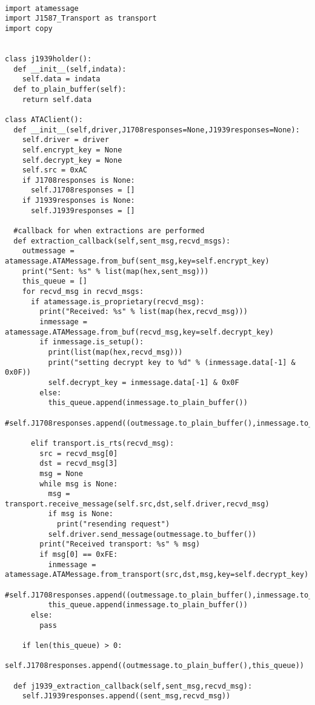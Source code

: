 \begin{verbatim}

import atamessage
import J1587_Transport as transport
import copy


class j1939holder():
  def __init__(self,indata):
    self.data = indata
  def to_plain_buffer(self):
    return self.data

class ATAClient():
  def __init__(self,driver,J1708responses=None,J1939responses=None):
    self.driver = driver
    self.encrypt_key = None
    self.decrypt_key = None
    self.src = 0xAC
    if J1708responses is None:
      self.J1708responses = []
    if J1939responses is None:
      self.J1939responses = []

  #callback for when extractions are performed
  def extraction_callback(self,sent_msg,recvd_msgs):
    outmessage = atamessage.ATAMessage.from_buf(sent_msg,key=self.encrypt_key)
    print("Sent: %s" % list(map(hex,sent_msg)))
    this_queue = []
    for recvd_msg in recvd_msgs:
      if atamessage.is_proprietary(recvd_msg):
        print("Received: %s" % list(map(hex,recvd_msg)))
        inmessage = atamessage.ATAMessage.from_buf(recvd_msg,key=self.decrypt_key)
        if inmessage.is_setup():
          print(list(map(hex,recvd_msg)))
          print("setting decrypt key to %d" % (inmessage.data[-1] & 0x0F))
          self.decrypt_key = inmessage.data[-1] & 0x0F
        else:
          this_queue.append(inmessage.to_plain_buffer())
        #self.J1708responses.append((outmessage.to_plain_buffer(),inmessage.to_plain_buffer()))

      elif transport.is_rts(recvd_msg):
        src = recvd_msg[0]
        dst = recvd_msg[3]
        msg = None
        while msg is None:
          msg = transport.receive_message(self.src,dst,self.driver,recvd_msg)
          if msg is None:
            print("resending request")
          self.driver.send_message(outmessage.to_buffer())
        print("Received transport: %s" % msg)
        if msg[0] == 0xFE:
          inmessage = atamessage.ATAMessage.from_transport(src,dst,msg,key=self.decrypt_key)
          #self.J1708responses.append((outmessage.to_plain_buffer(),inmessage.to_plain_buffer()))
          this_queue.append(inmessage.to_plain_buffer())
      else:
        pass

    if len(this_queue) > 0:
      self.J1708responses.append((outmessage.to_plain_buffer(),this_queue))

  def j1939_extraction_callback(self,sent_msg,recvd_msg):
    self.J1939responses.append((sent_msg,recvd_msg))


\end{verbatim}


